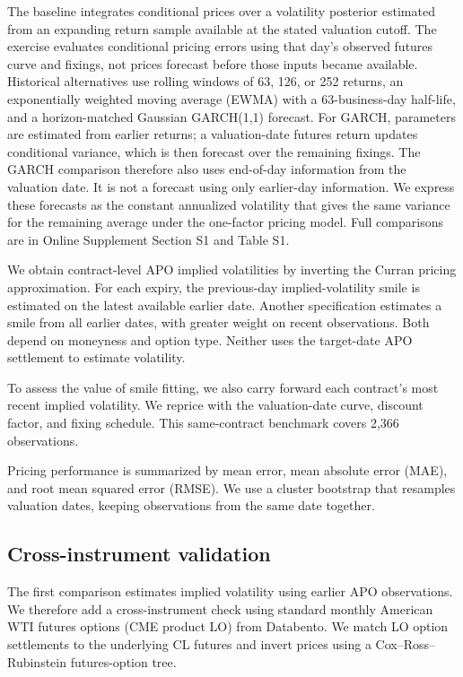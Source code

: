 The baseline integrates conditional prices over a volatility posterior estimated from an expanding return sample available at the stated valuation cutoff. The exercise evaluates conditional pricing errors using that day's observed futures curve and fixings, not prices forecast before those inputs became available. Historical alternatives use rolling windows of 63, 126, or 252 returns, an exponentially weighted moving average (EWMA) with a 63-business-day half-life, and a horizon-matched Gaussian GARCH(1,1) forecast. For GARCH, parameters are estimated from earlier returns; a valuation-date futures return updates conditional variance, which is then forecast over the remaining fixings. The GARCH comparison therefore also uses end-of-day information from the valuation date. It is not a forecast using only earlier-day information. We express these forecasts as the constant annualized volatility that gives the same variance for the remaining average under the one-factor pricing model. Full comparisons are in Online Supplement Section S1 and Table S1.

We obtain contract-level APO implied volatilities by inverting the Curran pricing approximation. For each expiry, the previous-day implied-volatility smile is estimated on the latest available earlier date. Another specification estimates a smile from all earlier dates, with greater weight on recent observations. Both depend on moneyness and option type. Neither uses the target-date APO settlement to estimate volatility.

To assess the value of smile fitting, we also carry forward each contract's most recent implied volatility. We reprice with the valuation-date curve, discount factor, and fixing schedule. This same-contract benchmark covers 2,366 observations.

Pricing performance is summarized by mean error, mean absolute error (MAE), and root mean squared error (RMSE). We use a cluster bootstrap that resamples valuation dates, keeping observations from the same date together.

\subsection{Cross-instrument validation}

The first comparison estimates implied volatility using earlier APO observations. We therefore add a cross-instrument check using standard monthly American WTI futures options (CME product LO) from Databento. We match LO option settlements to the underlying CL futures and invert prices using a Cox--Ross--Rubinstein futures-option tree.

